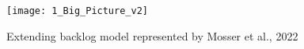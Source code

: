 \begin{landscape}
\begin{figure}
\texttt{[image: 1\_Big\_Picture\_v2]}
\caption{Extending backlog model represented by Mosser et al., 2022\cite{mosser2022modelling}}\label{fig:workflow_diagram}
\restoregeometry
\end{figure}
\thispagestyle{empty}
\end{landscape}


